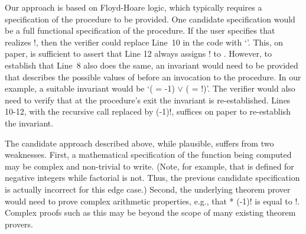 %
%
%
Our approach is based on Floyd-Hoare logic, which typically
requires a specification of the procedure to be provided. One candidate
specification would be a full functional specification of the
procedure. If the user specifies that  realizes !, then the
verifier could replace Line~10 in the code with `'. This, on
paper, is sufficient to assert that Line 12 always assigns ! to
. However, to establish that Line~8 also does the same, an invariant
would need to be provided that describes the possible values of  before
an invocation to the procedure. In our example, a suitable invariant would
be `( = -1) $\vee$ ( = !)'. The verifier would also need to verify
that at the procedure's exit the invariant is re-established. Lines 10-12,
with the recursive call replaced by (-1)!, suffices on paper to
re-establish the invariant.

The candidate approach described above, while plausible, suffers from
two weaknesses. First, a mathematical specification of the function
being computed may be complex and non-trivial to write. (Note, for example,
that  is defined for negative integers while factorial is not.
Thus, the previous candidate specification is actually incorrect for this edge
case.)
Second, the underlying theorem prover
would need to prove complex arithmetic properties, e.g., that  * (-1)! is
equal to !. Complex proofs such as this may be beyond the scope of many
existing theorem provers.

